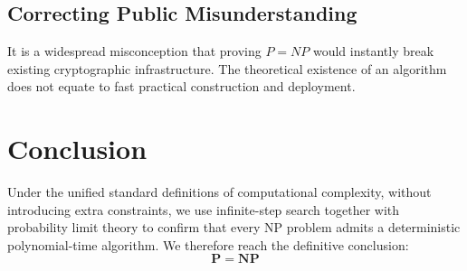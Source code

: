 \documentclass[10pt,a4paper]{article}
\begin{document}
\subsection{Correcting Public Misunderstanding}
It is a widespread misconception that proving $P=NP$ would instantly break existing cryptographic infrastructure. The theoretical existence of an algorithm does not equate to fast practical construction and deployment.
\section{Conclusion}
Under the unified standard definitions of computational complexity, without introducing extra constraints, we use infinite-step search together with probability limit theory to confirm that every NP problem admits a deterministic polynomial-time algorithm.
We therefore reach the definitive conclusion:
\[
\boldsymbol{P=NP}
\]
\end{document}
